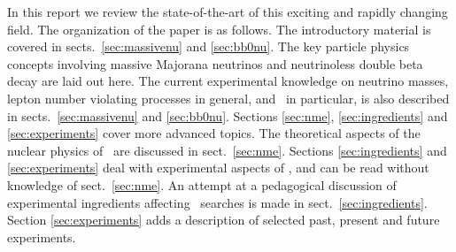 In this report we review the state-of-the-art of this exciting and rapidly changing field. 
The organization of the paper is as follows. The introductory material is covered in sects.~\ref{sec:massivenu} and \ref{sec:bb0nu}. The key particle physics concepts involving massive Majorana neutrinos and neutrinoless double beta decay are laid out here. The current experimental knowledge on neutrino masses, lepton number violating processes in general, and \bbonu\ in particular, is also described in sects.~\ref{sec:massivenu} and \ref{sec:bb0nu}. Sections \ref{sec:nme}, \ref{sec:ingredients} and \ref{sec:experiments} cover more advanced topics. The theoretical aspects of the nuclear physics of \bbonu\ are discussed in sect.~\ref{sec:nme}. Sections \ref{sec:ingredients} and \ref{sec:experiments} deal with experimental aspects of \bbonu, and can be read without knowledge of sect.~\ref{sec:nme}. An attempt at a pedagogical discussion of experimental ingredients affecting \bbonu\ searches is made in sect.~\ref{sec:ingredients}. Section \ref{sec:experiments} adds a description of selected past, present and future experiments. 

